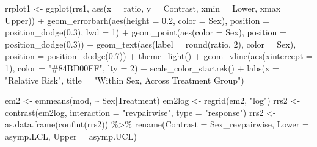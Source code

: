 \documentclass[12pt]{article}
\newenvironment{Shaded}{\begin{snugshade}}{\end{snugshade}}
\newcommand{\AttributeTok}[1]{\textcolor[rgb]{0.77,0.63,0.00}{#1}}
\newcommand{\DecValTok}[1]{\textcolor[rgb]{0.00,0.00,0.81}{#1}}
\newcommand{\FloatTok}[1]{\textcolor[rgb]{0.00,0.00,0.81}{#1}}
\newcommand{\FunctionTok}[1]{\textcolor[rgb]{0.00,0.00,0.00}{#1}}
\newcommand{\NormalTok}[1]{#1}
\newcommand{\OtherTok}[1]{\textcolor[rgb]{0.56,0.35,0.01}{#1}}
\newcommand{\SpecialCharTok}[1]{\textcolor[rgb]{0.00,0.00,0.00}{#1}}
\newcommand{\StringTok}[1]{\textcolor[rgb]{0.31,0.60,0.02}{#1}}
\begin{document}
\begin{Shaded}
\begin{Highlighting}[]
\NormalTok{rrplot1 }\OtherTok{\textless{}{-}} \FunctionTok{ggplot}\NormalTok{(rrs1, }\FunctionTok{aes}\NormalTok{(}\AttributeTok{x =}\NormalTok{ ratio, }\AttributeTok{y =}\NormalTok{ Contrast, }\AttributeTok{xmin =}\NormalTok{ Lower, }\AttributeTok{xmax =}\NormalTok{ Upper)) }\SpecialCharTok{+}
  \FunctionTok{geom\_errorbarh}\NormalTok{(}\FunctionTok{aes}\NormalTok{(}\AttributeTok{height =} \FloatTok{0.2}\NormalTok{, }\AttributeTok{color =}\NormalTok{ Sex),}
                 \AttributeTok{position =} \FunctionTok{position\_dodge}\NormalTok{(}\FloatTok{0.3}\NormalTok{), }\AttributeTok{lwd =} \DecValTok{1}\NormalTok{) }\SpecialCharTok{+}
  \FunctionTok{geom\_point}\NormalTok{(}\FunctionTok{aes}\NormalTok{(}\AttributeTok{color =}\NormalTok{ Sex), }\AttributeTok{position =} \FunctionTok{position\_dodge}\NormalTok{(}\FloatTok{0.3}\NormalTok{)) }\SpecialCharTok{+}
  \FunctionTok{geom\_text}\NormalTok{(}\FunctionTok{aes}\NormalTok{(}\AttributeTok{label =} \FunctionTok{round}\NormalTok{(ratio, }\DecValTok{2}\NormalTok{), }\AttributeTok{color =}\NormalTok{ Sex), }
            \AttributeTok{position =} \FunctionTok{position\_dodge}\NormalTok{(}\FloatTok{0.7}\NormalTok{)) }\SpecialCharTok{+}
  \FunctionTok{theme\_light}\NormalTok{() }\SpecialCharTok{+}
  \FunctionTok{geom\_vline}\NormalTok{(}\FunctionTok{aes}\NormalTok{(}\AttributeTok{xintercept =} \DecValTok{1}\NormalTok{), }\AttributeTok{color =} \StringTok{"\#84BD00FF"}\NormalTok{, }\AttributeTok{lty =} \DecValTok{2}\NormalTok{) }\SpecialCharTok{+}
  \FunctionTok{scale\_color\_startrek}\NormalTok{() }\SpecialCharTok{+}
  \FunctionTok{labs}\NormalTok{(}\AttributeTok{x =} \StringTok{"Relative Risk"}\NormalTok{,}
       \AttributeTok{title =} \StringTok{"Within Sex, Across Treatment Group"}\NormalTok{)}

\NormalTok{em2 }\OtherTok{\textless{}{-}} \FunctionTok{emmeans}\NormalTok{(mod, }\SpecialCharTok{\textasciitilde{}}\NormalTok{ Sex}\SpecialCharTok{|}\NormalTok{Treatment)}
\NormalTok{em2log }\OtherTok{\textless{}{-}} \FunctionTok{regrid}\NormalTok{(em2, }\StringTok{"log"}\NormalTok{)}
\NormalTok{rrs2 }\OtherTok{\textless{}{-}} \FunctionTok{contrast}\NormalTok{(em2log, }\AttributeTok{interaction =} \StringTok{"revpairwise"}\NormalTok{, }\AttributeTok{type =} \StringTok{"response"}\NormalTok{)}
\NormalTok{rrs2 }\OtherTok{\textless{}{-}} \FunctionTok{as.data.frame}\NormalTok{(}\FunctionTok{confint}\NormalTok{(rrs2)) }\SpecialCharTok{\%\textgreater{}\%}
  \FunctionTok{rename}\NormalTok{(}\AttributeTok{Contrast =}\NormalTok{ Sex\_revpairwise, }\AttributeTok{Lower =}\NormalTok{ asymp.LCL, }\AttributeTok{Upper =}\NormalTok{ asymp.UCL)}


\end{Highlighting}
\end{Shaded}
\end{document}
